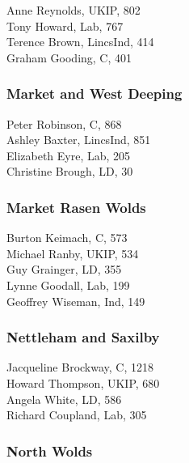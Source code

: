 \documentclass[a4paper,openany,10pt]{book}
\begin{document}


Anne Reynolds, UKIP, 802\\
Tony Howard, Lab, 767\\
Terence Brown, LincsInd, 414\\
Graham Gooding, C, 401\\


\subsubsection*{Market and West Deeping}



Peter Robinson, C, 868\\
Ashley Baxter, LincsInd, 851\\
Elizabeth Eyre, Lab, 205\\
Christine Brough, LD, 30\\


\subsubsection*{Market Rasen Wolds}



Burton Keimach, C, 573\\
Michael Ranby, UKIP, 534\\
Guy Grainger, LD, 355\\
Lynne Goodall, Lab, 199\\
Geoffrey Wiseman, Ind, 149\\


\subsubsection*{Nettleham and Saxilby}



Jacqueline Brockway, C, 1218\\
Howard Thompson, UKIP, 680\\
Angela White, LD, 586\\
Richard Coupland, Lab, 305\\


\subsubsection*{North Wolds}
\end{document}
